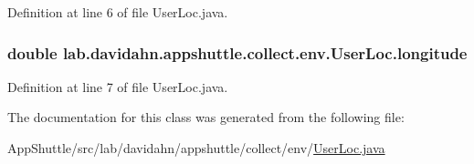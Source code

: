 \-Definition at line 6 of file \-User\-Loc.\-java.

\hypertarget{classlab_1_1davidahn_1_1appshuttle_1_1collect_1_1env_1_1_user_loc_a04684fd186120d620f7552d99a0184cb}{
\subsubsection[{longitude}]{\setlength{\rightskip}{0pt plus 5cm}double {\bf lab.\-davidahn.\-appshuttle.\-collect.\-env.\-User\-Loc.\-longitude}}}\label{classlab_1_1davidahn_1_1appshuttle_1_1collect_1_1env_1_1_user_loc_a04684fd186120d620f7552d99a0184cb}


\-Definition at line 7 of file \-User\-Loc.\-java.



\-The documentation for this class was generated from the following file\-:\begin{DoxyCompactItemize}
\item 
\-App\-Shuttle/src/lab/davidahn/appshuttle/collect/env/\hyperlink{_user_loc_8java}{\-User\-Loc.\-java}\end{DoxyCompactItemize}
